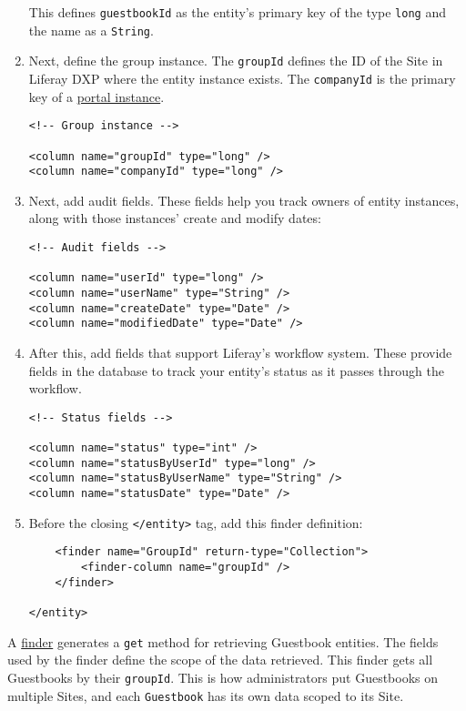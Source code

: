 \begin{enumerate}
  This defines \texttt{guestbookId} as the entity's primary key of the
  type \texttt{long} and the name as a \texttt{String}.
\item
  Next, define the group instance. The \texttt{groupId} defines the ID
  of the Site in Liferay DXP where the entity instance exists. The
  \texttt{companyId} is the primary key of a
  \href{/docs/7-2/user/-/knowledge_base/u/setting-up}{portal instance}.

\begin{verbatim}
<!-- Group instance -->

<column name="groupId" type="long" />
<column name="companyId" type="long" />
\end{verbatim}
\item
  Next, add audit fields. These fields help you track owners of entity
  instances, along with those instances' create and modify dates:

\begin{verbatim}
<!-- Audit fields -->

<column name="userId" type="long" />
<column name="userName" type="String" />
<column name="createDate" type="Date" />
<column name="modifiedDate" type="Date" />
\end{verbatim}
\item
  After this, add fields that support Liferay's workflow system. These
  provide fields in the database to track your entity's status as it
  passes through the workflow.

\begin{verbatim}
<!-- Status fields -->

<column name="status" type="int" />
<column name="statusByUserId" type="long" />
<column name="statusByUserName" type="String" />
<column name="statusDate" type="Date" />
\end{verbatim}
\item
  Before the closing \texttt{\textless{}/entity\textgreater{}} tag, add
  this finder definition:

\begin{verbatim}
    <finder name="GroupId" return-type="Collection">
        <finder-column name="groupId" />
    </finder>

</entity>
\end{verbatim}
\end{enumerate}

A
\href{/docs/7-2/appdev/-/knowledge_base/a/defining-service-entity-finder-methods}{finder}
generates a \texttt{get} method for retrieving Guestbook entities. The
fields used by the finder define the scope of the data retrieved. This
finder gets all Guestbooks by their \texttt{groupId}. This is how
administrators put Guestbooks on multiple Sites, and each
\texttt{Guestbook} has its own data scoped to its Site.

